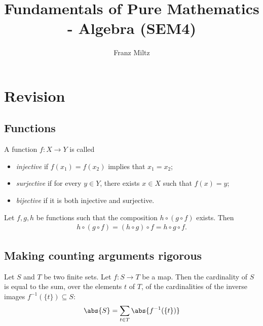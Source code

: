\documentclass{article}
\begin{document}
\mkfpmthms
\title{Fundamentals of Pure Mathematics - Algebra (SEM4)}
\author{Franz Miltz}
\maketitle
\tableofcontents
\pagebreak

\setcounter{section}{-1}


\section{Revision}


\subsection{Functions}

\begin{definition}
    A function $f:X\to Y$ is called
    \begin{itemize}
        \item \emph{injective} if $f(x_1)=f(x_2)$ implies that $x_1=x_2$;
        \item \emph{surjective} if for every $y\in Y$, there exists $x\in X$ such that $f(x)=y$;
        \item \emph{bijective} if it is both injective and surjective.
    \end{itemize}
\end{definition}

\begin{lemma}
    Let $f,g,h$ be functions such that the composition $h \circ (g \circ f)$ exists. Then
    \begin{align*}
        h \circ (g \circ f) = (h \circ g) \circ f = h \circ g \circ f.
    \end{align*}
\end{lemma}

\subsection{Making counting arguments rigorous}

\begin{theorem}
    Let $S$ and $T$ be two finite sets. Let $f:S\to T$ be a map.
    Then the cardinality of $S$ is equal to the sum, over the elements
    $t$ of $T$, of the cardinalities of the inverse images $f^{-1}(\{t\})\subseteq S$:
    \begin{align*}
        \abs{S} = \sum_{t\in T}\abs{f^{-1}(\{t\})}
    \end{align*}
\end{theorem}
\end{document}
